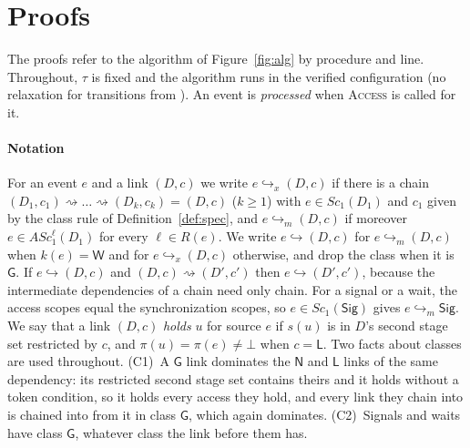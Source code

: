 \providecommand{\Sc}[1]{\mathit{Sc}_{#1}}
\providecommand{\ASc}[2]{\mathit{ASc}_{#1}^{#2}}
\providecommand{\ESs}{\mathit{ES}^{\mathrm{src}}}
\providecommand{\ESd}{\mathit{ES}^{\mathrm{dst}}}
\providecommand{\AS}{\mathit{AS}}
\providecommand{\chainto}{\rightsquigarrow}
\providecommand{\mspecl}[1]{\ensuremath{\Rightarrow_{m}^{#1}}}
\providecommand{\ordl}[1]{\mathit{ord}_{#1}}
\providecommand{\Hpw}{\ensuremath{\Haz_C^{\mathit{pw}}}}
\providecommand{\Hep}{\ensuremath{\Haz_C^{\mathit{ep}}}}
\providecommand{\Hspec}{\ensuremath{\Haz_{\mathit{spec}}}}
\providecommand{\pc}[1]{\textsc{#1}}
\providecommand{\reach}{\hookrightarrow}
\providecommand{\posof}{\pi}
\providecommand{\Hstrict}{\ensuremath{\Haz_{\mathit{spec}}^{\mathit{dom}}}}

\section{Proofs}
\label{app:proofs}

The proofs refer to the algorithm of Figure~\ref{fig:alg} by procedure and line. Throughout, $\tau$ is fixed and the
algorithm runs in the verified configuration (no relaxation for transitions from ). An event is
\emph{processed} when \pc{Access} is called for it.

\paragraph{Notation}
For an event $e$ and a link $(D,c)$ we write $e \reach_x (D,c)$ if there is a chain $(D_1,c_1) \chainto \dots
\chainto (D_k,c_k) = (D,c)$ ($k \ge 1$) with $e \in \Sc{1}(D_1)$ and $c_1$ given by the class rule of
Definition~\ref{def:spec}, and $e \reach_m (D,c)$ if moreover $e \in \ASc{1}{\ell}(D_1)$ for every $\ell \in R(e)$. We
write $e \reach (D,c)$ for $e \reach_m (D,c)$ when $k(e) = \mathsf{W}$ and for $e \reach_x (D,c)$ otherwise, and drop
the class when it is $\mathsf{G}$. If $e \reach (D,c)$ and $(D,c) \chainto (D',c')$ then $e \reach (D',c')$, because
the intermediate dependencies of a chain need only chain. For a signal or a wait, the access scopes equal the
synchronization scopes, so $e \in \Sc{1}(\mathsf{Sig})$ gives $e \reach_m \mathsf{Sig}$. We say that a link $(D,c)$
\emph{holds} $u$ for source $e$ if $s(u)$ is in $D$'s second stage set restricted by $c$, and $\posof(u) = \posof(e)
\ne \bot$ when $c = \mathsf{L}$. Two facts about classes are used throughout. (C1)~A $\mathsf{G}$ link dominates the $\mathsf{N}$ and
$\mathsf{L}$ links of the same dependency: its restricted second stage set contains theirs and it holds without a
token condition, so it holds every access they hold, and every link they chain into is chained into from it in class
$\mathsf{G}$, which again dominates. (C2)~Signals and waits have class $\mathsf{G}$, whatever class the link before
them has.

